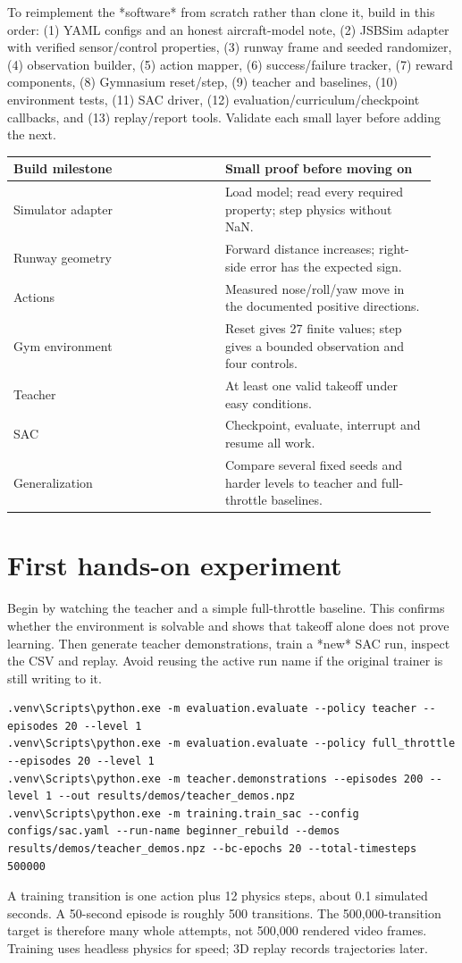 \documentclass[11pt,a4paper]{article}
\begin{document}
To reimplement the *software* from scratch rather than clone it, build in this order: (1) YAML configs and an honest aircraft-model note, (2) JSBSim adapter with verified sensor/control properties, (3) runway frame and seeded randomizer, (4) observation builder, (5) action mapper, (6) success/failure tracker, (7) reward components, (8) Gymnasium reset/step, (9) teacher and baselines, (10) environment tests, (11) SAC driver, (12) evaluation/curriculum/checkpoint callbacks, and (13) replay/report tools. Validate each small layer before adding the next.

\begin{longtable}{|p{0.47\linewidth}|p{0.47\linewidth}|}\hline
Build milestone & Small proof before moving on \\ \hline
Simulator adapter & Load model; read every required property; step physics without NaN. \\ \hline
Runway geometry & Forward distance increases; right-side error has the expected sign. \\ \hline
Actions & Measured nose/roll/yaw move in the documented positive directions. \\ \hline
Gym environment & Reset gives 27 finite values; step gives a bounded observation and four controls. \\ \hline
Teacher & At least one valid takeoff under easy conditions. \\ \hline
SAC & Checkpoint, evaluate, interrupt and resume all work. \\ \hline
Generalization & Compare several fixed seeds and harder levels to teacher and full-throttle baselines. \\ \hline
\end{longtable}
\section{First hands-on experiment}
Begin by watching the teacher and a simple full-throttle baseline. This confirms whether the environment is solvable and shows that takeoff alone does not prove learning. Then generate teacher demonstrations, train a *new* SAC run, inspect the CSV and replay. Avoid reusing the active run name if the original trainer is still writing to it.

\begin{Verbatim}[fontsize=\small]
.venv\Scripts\python.exe -m evaluation.evaluate --policy teacher --episodes 20 --level 1
.venv\Scripts\python.exe -m evaluation.evaluate --policy full_throttle --episodes 20 --level 1
.venv\Scripts\python.exe -m teacher.demonstrations --episodes 200 --level 1 --out results/demos/teacher_demos.npz
.venv\Scripts\python.exe -m training.train_sac --config configs/sac.yaml --run-name beginner_rebuild --demos results/demos/teacher_demos.npz --bc-epochs 20 --total-timesteps 500000
\end{Verbatim}
A training transition is one action plus 12 physics steps, about 0.1 simulated seconds. A 50-second episode is roughly 500 transitions. The 500,000-transition target is therefore many whole attempts, not 500,000 rendered video frames. Training uses headless physics for speed; 3D replay records trajectories later.
\end{document}
